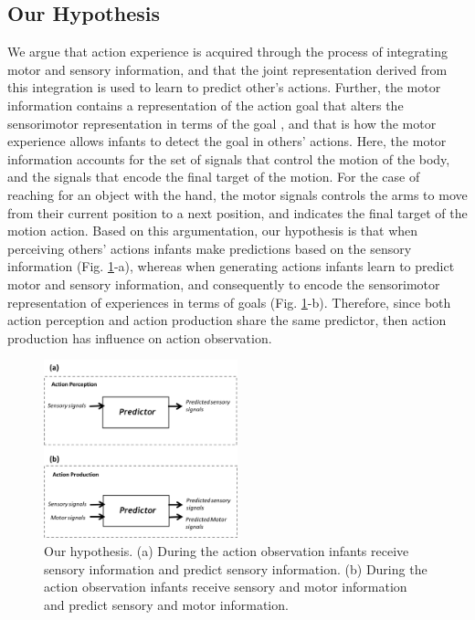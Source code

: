 \documentclass[conference]{IEEEtran}
\begin{document}
\subsection{Our Hypothesis}
We argue that action experience is acquired through the process of integrating motor and sensory information, and that the joint representation derived from this integration is used to learn to predict other's actions. Further, the motor information contains a representation of the action goal that alters the sensorimotor representation in terms of the goal \cite{rizzolatti2014cortical}, and that is how the motor experience allows infants to detect the goal in others' actions. Here, the motor information accounts for the set of signals that control the motion of the body, and the signals that encode the final target of the motion. For the case of reaching for an object with the hand, the motor signals controls the arms to move from their current position to a next position, and indicates the final target of the motion action. Based on this argumentation, our hypothesis is that when perceiving others' actions infants make predictions based on the sensory information (Fig. \ref{Hypothesis}-a), whereas when generating actions infants learn to predict motor and sensory information, and consequently to encode the sensorimotor representation of experiences in terms of goals (Fig. \ref{Hypothesis}-b). Therefore, since both action perception and action production share the same predictor, then action production has influence on action observation.

\begin{figure}[!t]
\centering
\includegraphics[width=0.5\textwidth,natwidth=700,natheight=450]{Hypothesis.png}
\caption{Our hypothesis. (a) During the action observation infants receive sensory information and predict sensory information. (b) During the action observation infants receive sensory and motor information and predict sensory and motor information.}
\label{Hypothesis}
\end{figure}
\end{document}
